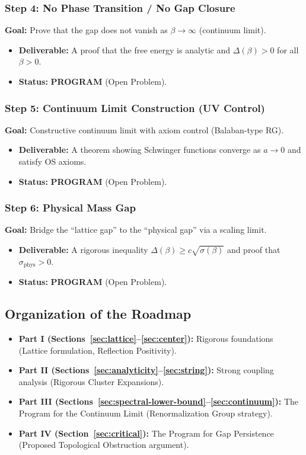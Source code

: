 \subsubsection*{Step 4: No Phase Transition / No Gap Closure}
\textbf{Goal:} Prove that the gap does not vanish as $\beta \to \infty$ (continuum limit).
\begin{itemize}
    \item \textbf{Deliverable:} A proof that the free energy is analytic and $\Delta(\beta) > 0$ for all $\beta > 0$.
    \item \textbf{Status:} \textbf{PROGRAM} (Open Problem).
\end{itemize}

\subsubsection*{Step 5: Continuum Limit Construction (UV Control)}
\textbf{Goal:} Constructive continuum limit with axiom control (Balaban-type RG).
\begin{itemize}
    \item \textbf{Deliverable:} A theorem showing Schwinger functions converge as $a \to 0$ and satisfy OS axioms.
    \item \textbf{Status:} \textbf{PROGRAM} (Open Problem).
\end{itemize}

\subsubsection*{Step 6: Physical Mass Gap}
\textbf{Goal:} Bridge the ``lattice gap'' to the ``physical gap'' via a scaling limit.
\begin{itemize}
    \item \textbf{Deliverable:} A rigorous inequality $\Delta(\beta) \ge c \sqrt{\sigma(\beta)}$ and proof that $\sigma_{\text{phys}} > 0$.
    \item \textbf{Status:} \textbf{PROGRAM} (Open Problem).
\end{itemize}

\subsection{Organization of the Roadmap}

\begin{itemize}
    \item \textbf{Part I (Sections~\ref{sec:lattice}--\ref{sec:center}):} Rigorous foundations (Lattice formulation, Reflection Positivity).
    \item \textbf{Part II (Sections~\ref{sec:analyticity}--\ref{sec:string}):} Strong coupling analysis (Rigorous Cluster Expansions).
    \item \textbf{Part III (Sections~\ref{sec:spectral-lower-bound}--\ref{sec:continuum}):} The Program for the Continuum Limit (Renormalization Group strategy).
    \item \textbf{Part IV (Section~\ref{sec:critical}):} The Program for Gap Persistence (Proposed Topological Obstruction argument).
\end{itemize}


